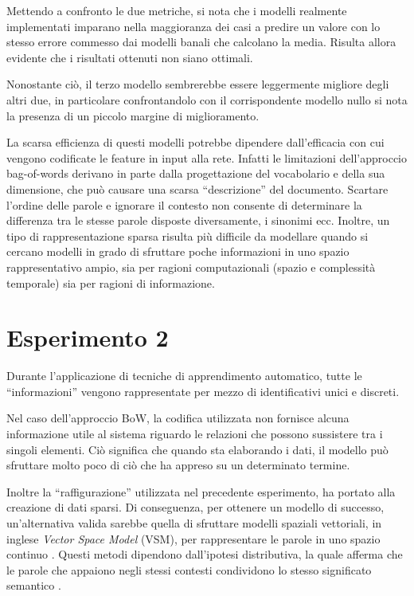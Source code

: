 Mettendo a confronto le due metriche, si nota che i modelli realmente implementati imparano nella maggioranza dei casi a predire un valore con lo stesso errore commesso dai modelli banali che calcolano la media. Risulta allora evidente che i risultati ottenuti non siano ottimali.

Nonostante ciò, il terzo modello sembrerebbe essere leggermente migliore degli altri due, in particolare confrontandolo con il corrispondente modello nullo si nota la presenza di un piccolo margine di miglioramento.

La scarsa efficienza di questi modelli potrebbe dipendere dall'efficacia con cui vengono codificate le feature in input alla rete. 
Infatti le limitazioni dell'approccio bag-of-words derivano in parte dalla progettazione del vocabolario e della sua dimensione, che può causare una scarsa ``descrizione'' del documento. 
Scartare l'ordine delle parole e ignorare il contesto non consente di determinare la differenza tra le stesse parole disposte diversamente, i sinonimi ecc.
Inoltre, un tipo di rappresentazione sparsa risulta più difficile da modellare quando si cercano modelli in grado di sfruttare poche informazioni in uno spazio rappresentativo ampio, sia per ragioni computazionali (spazio e complessità temporale) sia per ragioni di informazione.

\section{Esperimento 2}
\label{sec:es2}

Durante l'applicazione di tecniche di apprendimento automatico, tutte le ``informazioni'' vengono rappresentate per mezzo di identificativi unici e discreti. 

Nel caso dell'approccio {BoW}, la codifica utilizzata non fornisce alcuna informazione utile al sistema riguardo le relazioni che possono sussistere tra i singoli elementi. Ciò significa che quando sta elaborando i dati, il modello può sfruttare molto poco di ciò che ha appreso su un determinato termine. 

Inoltre la ``raffigurazione'' utilizzata nel precedente esperimento, ha portato alla creazione di dati sparsi. Di conseguenza, per ottenere un modello di successo, un'alternativa valida sarebbe quella di sfruttare {modelli spaziali vettoriali}, in inglese \emph{Vector Space Model} (VSM), per rappresentare le parole in uno spazio continuo \cite{mikolov2013linguistic,erk2008structured}.
Questi metodi dipendono dall'ipotesi distributiva, la quale afferma che le parole che appaiono negli stessi contesti condividono lo stesso significato semantico \cite{baroni2014don}. 

